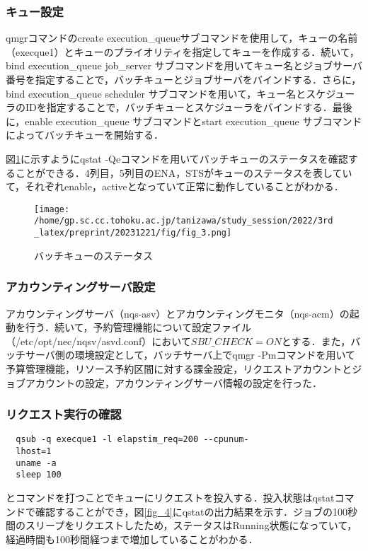 \documentclass[a4paper,oneside,twocolumn,notitlepage,dvipdfmx]{jsarticle}
\begin{document}
\subsubsection{キュー設定}
qmgrコマンドのcreate execution\_queueサブコマンドを使用して，キューの名前（execque1）とキューのプライオリティを指定してキューを作成する．続いて，bind execution\_queue job\_server サブコマンドを用いてキュー名とジョブサーバ番号を指定することで，バッチキューとジョブサーバをバインドする．さらに，bind execution\_queue scheduler サブコマンドを用いて，キュー名とスケジューラのIDを指定することで，バッチキューとスケジューラをバインドする．最後に，enable execution\_queue サブコマンドとstart execution\_queue サブコマンドによってバッチキューを開始する．\par
図\ref{fig_3}に示すようにqstat -Qeコマンドを用いてバッチキューのステータスを確認することができる．4列目，5列目のENA，STSがキューのステータスを表していて，それぞれenable，activeとなっていて正常に動作していることがわかる．\par

\begin{figure}[h]
  \centering
  \texttt{[image: /home/gp.sc.cc.tohoku.ac.jp/tanizawa/study\_session/2022/3rd\_latex/preprint/20231221/fig/fig\_3.png]}
  \caption{バッチキューのステータス}
  \label{fig_3}
\end{figure}

\subsubsection{アカウンティングサーバ設定}
アカウンティングサーバ（nqs-asv）とアカウンティングモニタ（nqs-acm）の起動を行う．続いて，予約管理機能について設定ファイル（/etc/opt/nec/nqsv/asvd.conf）において$SBU\_CHECK=ON$とする．また，バッチサーバ側の環境設定として，バッチサーバ上でqmgr -Pmコマンドを用いて予算管理機能，リソース予約区間に対する課金設定，リクエストアカウントとジョブアカウントの設定，アカウンティングサーバ情報の設定を行った．

\subsubsection{リクエスト実行の確認}

\begin{verbatim}
  qsub -q execque1 -l elapstim_req=200 --cpunum-
  lhost=1
  uname -a
  sleep 100
\end{verbatim}

とコマンドを打つことでキューにリクエストを投入する．投入状態はqstatコマンドで確認することができ，図\ref{fig_4}にqstatの出力結果を示す．ジョブの100秒間のスリープをリクエストしたため，ステータスはRunning状態になっていて，経過時間も100秒間経つまで増加していることがわかる．\par
\end{document}

